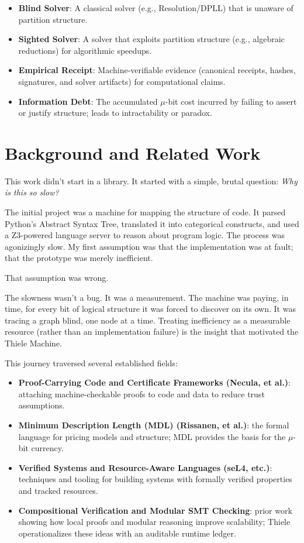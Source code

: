 \documentclass[11pt]{article}
\begin{document}
\begin{itemize}
  \item \textbf{Blind Solver}: A classical solver (e.g., Resolution/DPLL) that is unaware of partition structure.
  \item \textbf{Sighted Solver}: A solver that exploits partition structure (e.g., algebraic reductions) for algorithmic speedups.
  \item \textbf{Empirical Receipt}: Machine-verifiable evidence (canonical receipts, hashes, signatures, and solver artifacts) for computational claims.
  \item \textbf{Information Debt}: The accumulated \(\mu\)-bit cost incurred by failing to assert or justify structure; leads to intractability or paradox.
\end{itemize}

\section{Background and Related Work}
This work didn't start in a library. It started with a simple, brutal question: \emph{Why is this so slow?}

The initial project was a machine for mapping the structure of code. It parsed Python's Abstract Syntax Tree, translated it into categorical constructs, and used a Z3-powered language server to reason about program logic. The process was agonizingly slow. My first assumption was that the implementation was at fault; that the prototype was merely inefficient.

That assumption was wrong.

The slowness wasn't a bug. It was a measurement. The machine was paying, in time, for every bit of logical structure it was forced to discover on its own. It was tracing a graph blind, one node at a time. Treating inefficiency as a measurable resource (rather than an implementation failure) is the insight that motivated the Thiele Machine.

This journey traversed several established fields:
\begin{itemize}
  \item \textbf{Proof-Carrying Code and Certificate Frameworks (Necula, et al.)}: attaching machine-checkable proofs to code and data to reduce trust assumptions.
  \item \textbf{Minimum Description Length (MDL) (Rissanen, et al.)}: the formal language for pricing models and structure; MDL provides the basis for the \(\mu\)-bit currency.
  \item \textbf{Verified Systems and Resource-Aware Languages (seL4, etc.)}: techniques and tooling for building systems with formally verified properties and tracked resources.
  \item \textbf{Compositional Verification and Modular SMT Checking}: prior work showing how local proofs and modular reasoning improve scalability; Thiele operationalizes these ideas with an auditable runtime ledger.
\end{itemize}
\end{document}
